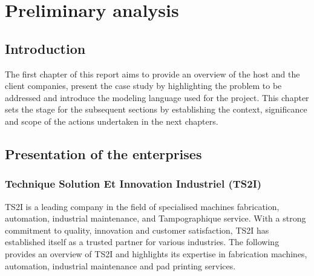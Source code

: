 \chapter{Preliminary analysis}

\section*{Introduction}

\hspace*{0.777cm} The first chapter of this report aims to provide an overview of the host and the client companies,
present the case study by highlighting the problem to be addressed and introduce the modeling language
used for the project. This chapter sets the stage for the subsequent sections by establishing the
context, significance and scope of the actions undertaken in the next chapters.

\section{\fontsize{15}{18}\selectfont Presentation of the enterprises}

\subsection{\fontsize{14}{17}\selectfont Technique Solution Et Innovation Industriel (TS2I)}

\hspace*{0.777cm} TS2I is a leading company in the field of specialised machines fabrication, automation, industrial
maintenance, and Tampographique service. With a strong commitment to quality, innovation and
customer satisfaction, TS2I has established itself as a trusted partner for various industries.
The following provides an overview of TS2I and highlights its expertise in fabrication machines,
automation, industrial maintenance and pad printing services.

